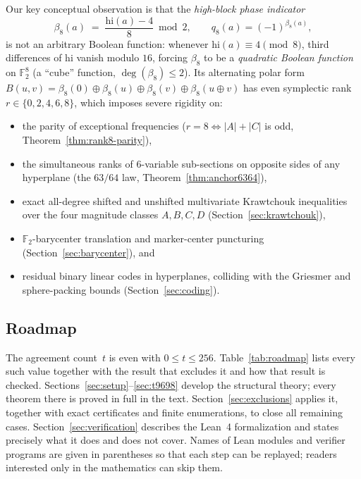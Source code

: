 \documentclass[11pt]{article}
\theoremstyle{definition}
\newcommand{\F}{\mathbb{F}}
\begin{document}
Our key conceptual observation is that the \emph{high-block phase indicator}
\[
  \beta_8(a) \;=\; \frac{\mathrm{hi}(a) - 4}{8} \bmod 2, \qquad q_8(a) = (-1)^{\beta_8(a)},
\]
is not an arbitrary Boolean function: whenever $\mathrm{hi}(a) \equiv 4 \pmod 8$, third differences of $\mathrm{hi}$ vanish modulo $16$, forcing $\beta_8$ to be a \emph{quadratic Boolean function} on $\F_2^8$ (a ``cube'' function, $\deg(\beta_8) \le 2$).
Its alternating polar form $B(u, v) = \beta_8(0) \oplus \beta_8(u) \oplus \beta_8(v) \oplus \beta_8(u \oplus v)$ has even symplectic rank $r \in \{0, 2, 4, 6, 8\}$, which imposes severe rigidity on:
\begin{itemize}[nosep]
  \item the parity of exceptional frequencies ($r = 8 \iff |A| + |C|$ is odd, Theorem~\ref{thm:rank8-parity}),
  \item the simultaneous ranks of $6$-variable sub-sections on opposite sides of any hyperplane (the $63/64$ law, Theorem~\ref{thm:anchor6364}),
  \item exact all-degree shifted and unshifted multivariate Krawtchouk inequalities over the four magnitude classes $A, B, C, D$ (Section~\ref{sec:krawtchouk}),
  \item $\F_2$-barycenter translation and marker-center puncturing (Section~\ref{sec:barycenter}), and
  \item residual binary linear codes in hyperplanes, colliding with the Griesmer and sphere-packing bounds (Section~\ref{sec:coding}).
\end{itemize}

\subsection{Roadmap}
The agreement count~$t$ is even with $0\le t\le 256$. Table~\ref{tab:roadmap} lists every such value together with the result that excludes it and how that result is checked.
Sections~\ref{sec:setup}--\ref{sec:t9698} develop the structural theory; every theorem there is proved in full in the text.
Section~\ref{sec:exclusions} applies it, together with exact certificates and finite enumerations, to close all remaining cases.
Section~\ref{sec:verification} describes the Lean~4 formalization and states precisely what it does and does not cover.
Names of Lean modules and verifier programs are given in parentheses so that each step can be replayed; readers interested only in the mathematics can skip them.
\end{document}
